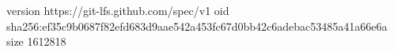 version https://git-lfs.github.com/spec/v1
oid sha256:ef35c9b0687f82efd683d9aae542a453fc67d0bb42c6adebac53485a41a66e6a
size 1612818
